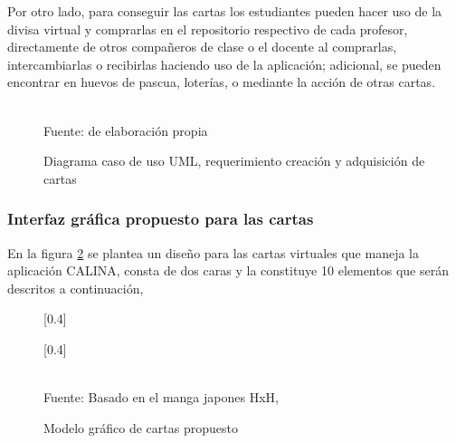 Por otro lado, para conseguir las cartas los estudiantes pueden hacer uso de la divisa virtual y comprarlas en
el repositorio respectivo de cada profesor, directamente de otros compañeros de clase o el docente al 
comprarlas, intercambiarlas o recibirlas haciendo uso de la aplicación; adicional, se pueden encontrar en 
huevos de pascua, loterías, o mediante la acción de otras cartas.

\begin{figure}[!htb]
\caption{Diagrama caso de uso UML, requerimiento creación y adquisición de cartas}
\label{img:UMLcreacioncartas}
\centering
\begin{adjustbox}{width=15cm}
	
\end{adjustbox}
\\
{\footnotesize Fuente: de elaboración propia}
\end{figure}

\subsubsection{Interfaz gráfica propuesto para las cartas}

En la figura \ref{img:modelodecartas} se plantea un diseño para las cartas virtuales que maneja la aplicación 
CALINA, consta de dos caras y la constituye 10 elementos que serán descritos a continuación,

\begin{figure}[!htb]
\caption{Modelo gráfico de cartas propuesto}
\label{img:modelodecartas}
\centering
	[0.4\linewidth]{
		\centering
		\begin{adjustbox}{width=7cm}
			
		\end{adjustbox}
	}
	[0.4\linewidth]{
		\centering
		\begin{adjustbox}{width=7cm}
			
		\end{adjustbox}
	}
\\ \vspace{2mm}
{\footnotesize Fuente: Basado en el manga japones HxH, }
\end{figure}

